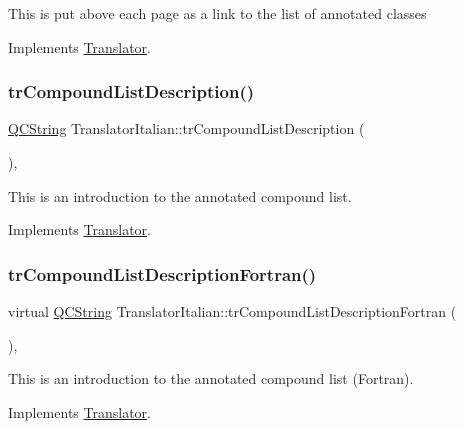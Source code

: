 This is put above each page as a link to the list of annotated classes 

Implements \mbox{\hyperlink{class_translator}{Translator}}.

\mbox{\label{class_translator_italian_a13ed3a773e9431d421de580180031617}} 
\subsubsection{\texorpdfstring{trCompoundListDescription()}{trCompoundListDescription()}}
{\footnotesize\ttfamily \mbox{\hyperlink{class_q_c_string}{Q\+C\+String}} Translator\+Italian\+::tr\+Compound\+List\+Description (\begin{DoxyParamCaption}{ }\end{DoxyParamCaption})\hspace{0.3cm}{\ttfamily [inline]}, {\ttfamily [virtual]}}

This is an introduction to the annotated compound list. 

Implements \mbox{\hyperlink{class_translator}{Translator}}.

\mbox{\label{class_translator_italian_a9c602fe1e41edc84b37a94cec44145a3}} 
\subsubsection{\texorpdfstring{trCompoundListDescriptionFortran()}{trCompoundListDescriptionFortran()}}
{\footnotesize\ttfamily virtual \mbox{\hyperlink{class_q_c_string}{Q\+C\+String}} Translator\+Italian\+::tr\+Compound\+List\+Description\+Fortran (\begin{DoxyParamCaption}{ }\end{DoxyParamCaption})\hspace{0.3cm}{\ttfamily [inline]}, {\ttfamily [virtual]}}

This is an introduction to the annotated compound list (Fortran). 

Implements \mbox{\hyperlink{class_translator}{Translator}}.

